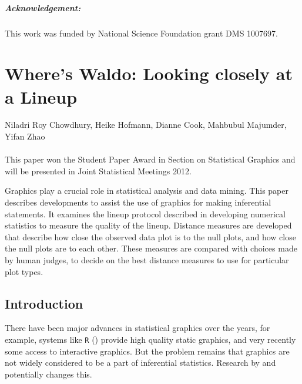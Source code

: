 \documentclass[12]{report}
\begin{document}
\paragraph{Acknowledgement:}
%
This work was funded by National Science Foundation grant DMS 1007697.


\chapter{Where's Waldo: Looking closely at a Lineup} \label{ch:waldo}
\vspace{-0.8cm}
\large{Niladri Roy Chowdhury, Heike Hofmann, Dianne Cook, Mahbubul Majumder, Yifan Zhao}\\ \\
\large{This paper won the Student Paper Award in Section on Statistical Graphics and will be presented in Joint Statistical Meetings 2012. } 

\vspace{1cm}
\normalsize
 Graphics play a crucial role in statistical analysis and data mining. This paper describes developments to assist the use of graphics for making inferential statements. It examines the lineup protocol described in \citet{buja:2009}  
  developing numerical statistics to measure the quality of the lineup. Distance measures are developed that describe how close the observed data plot is to the null plots, and how close the null plots are to each other. These measures are compared with choices made by human judges, to decide on the best distance measures to use for particular plot types.

\section{Introduction} 
There have been major advances in statistical graphics over the years, for example, systems like \texttt{R} (\cite{r}) provide high quality static graphics, and very recently some access to interactive graphics. But the problem remains that graphics are not widely considered to be a part of inferential statistics. Research by \citet{gelman:2004} and \citet{buja:2009} 
potentially changes this. 
\end{document}

